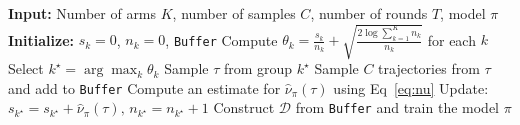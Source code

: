 \documentclass[manuscript,review]{acmart}
\begin{document}
{{%
\begin{algorithm}[t]
\caption{Task selection with UCB}
\label{alg:sampling}
\begin{algorithmic}[1]
\State \textbf{Input:} Number of arms $K$, number of samples $C$, number of rounds $T$, model $\pi$
\State \textbf{Initialize:} $s_k=0$, $n_k=0$, \texttt{Buffer}
    \State Compute $\theta_k = \tfrac{s_k}{n_k} + \sqrt{\tfrac{2 \log \sum_{k=1}^K n_k}{n_k}}$ for each $k$
    \State Select $k^\star = \arg\max_k \theta_k$
    \State Sample $\tau$ from group $k^\star$
    \State Sample $C$ trajectories from $\tau$ and add to \texttt{Buffer}
    \State Compute an estimate for $\hat{\nu}_\pi(\tau)$ using Eq~\ref{eq:nu}
    \State Update: $s_{k^\star} = s_{k^\star} + \hat{\nu}_\pi(\tau), \, n_{k^\star} = n_{k^\star} + 1$
\EndFor
\State Construct $\mathcal{D}$ from \texttt{Buffer} and train the model $\pi$
\end{algorithmic}
\end{algorithm}
}
}

\end{document}
